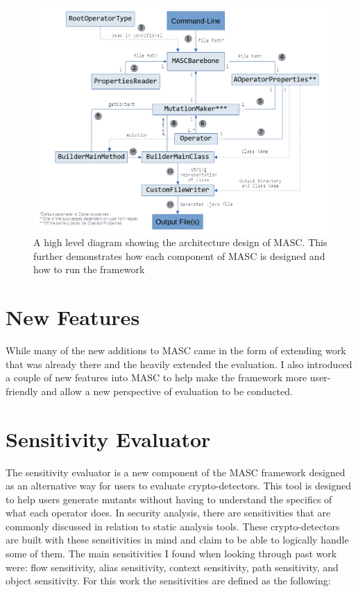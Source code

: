 \begin{figure}[!ht]
	\centering
    \includegraphics[width=0.96\linewidth]{figures/architecture.png}
	\vspace{-1.em}
    \caption{\small A high level diagram showing the architecture design of MASC. This further demonstrates how each component of MASC is designed and how to run the framework}
    \label{fig:architecture}
	
\end{figure}


\section{New Features}
\label{ch3:sec:new-features}

While many of the new additions to MASC came in the form of extending work that was already there and the heavily extended the evaluation. I also introduced a couple of new features into MASC to help make the framework more user-friendly and allow a new perspective of evaluation to be conducted.

\section{Sensitivity Evaluator}
\label{ch3:subsec:sensitities}

The sensitivity evaluator is a new component of the MASC framework designed as an alternative way for users to evaluate crypto-detectors. This tool is designed to help users generate mutants without having to understand the specifics of what each operator does. In security analysis, there are sensitivities that are commonly discussed in relation to static analysis tools. These crypto-detectors are built with these sensitivities in mind and claim to be able to logically handle some of them. The main sensitivities I found when looking through past work were: flow sensitivity, alias sensitivity, context sensitivity, path sensitivity, and object sensitivity. For this work the sensitivities are defined as the following:

